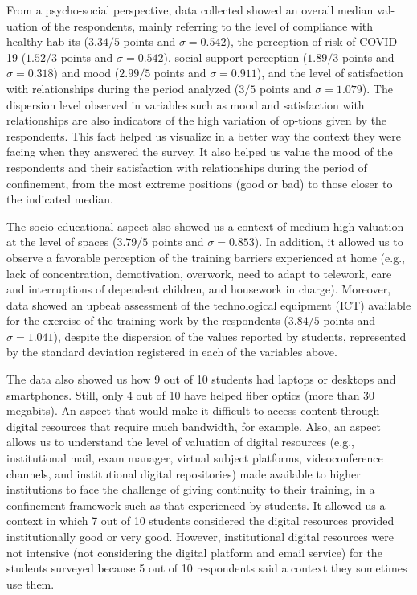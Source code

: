 \documentclass[english]{textolivre}
\begin{document}
From a psycho-social perspective, data collected showed an overall median val-uation of the respondents, mainly referring to the level of compliance with healthy hab-its ($3.34/5$ points and $\sigma=0.542$), the perception of risk of COVID-19 ($1.52/3$ points and $\sigma=0.542$), social support perception ($1.89/3$ points and $\sigma=0.318$) and mood ($2.99/5$ points and $\sigma=0.911$), and the level of satisfaction with relationships during the period analyzed ($3/5$ points and $\sigma=1.079$). The dispersion level observed in variables such as mood and satisfaction with relationships are also indicators of the high variation of op-tions given by the respondents. This fact helped us visualize in a better way the context they were facing when they answered the survey. It also helped us value the mood of the respondents and their satisfaction with relationships during the period of confinement, from the most extreme positions (good or bad) to those closer to the indicated median.

The socio-educational aspect also showed us a context of medium-high valuation at the level of spaces ($3.79/5$ points and $\sigma=0.853$). In addition, it allowed us to observe a favorable perception of the training barriers experienced at home (e.g., lack of concentration, demotivation, overwork, need to adapt to telework, care and interruptions of dependent children, and housework in charge). Moreover, data showed an upbeat assessment of the technological equipment (ICT) available for the exercise of the training work by the respondents ($3.84/5$ points and $\sigma=1.041$), despite the dispersion of the values reported by students, represented by the standard deviation registered in each of the variables above.

The data also showed us how 9 out of 10 students had laptops or desktops and smartphones. Still, only 4 out of 10 have helped fiber optics (more than 30 megabits). An aspect that would make it difficult to access content through digital resources that require much bandwidth, for example. Also, an aspect allows us to understand the level of valuation of digital resources (e.g., institutional mail, exam manager, virtual subject platforms, videoconference channels, and institutional digital repositories) made available to higher institutions to face the challenge of giving continuity to their training, in a confinement framework such as that experienced by students. It allowed us a context in which 7 out of 10 students considered the digital resources provided institutionally good or very good. However, institutional digital resources were not intensive (not considering the digital platform and email service) for the students surveyed because 5 out of 10 respondents said a context they sometimes use them.
\end{document}
